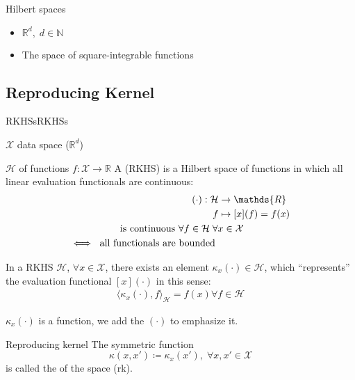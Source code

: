 \begin{example}{Hilbert spaces}{}
	\begin{itemize}
		\item $\mathds{R}^d, \; d \in \mathds{N}$
		\item The space of square-integrable functions
	\end{itemize}
\end{example}

\subsection{Reproducing Kernel}

\begin{definition}[parbox=false]{RKHSs}{RKHSs}

	$\mathcal{X}$ data space ($\mathds{R}^d$)

	$\mathcal{H}$ of functions $f: \mathcal{X} \to \mathds{R}$
	\tcbline
	A  (RKHS) is a Hilbert space
	of functions in which all linear evaluation functionals are continuous:
	\begin{align*}
		[x](\cdot) : \mathcal{H} & \to \mathds{R}                                     \\
		f                        & \mapsto [x](f) = f(x)                              \\
		\span
		\text{ is continuous } \forall f \in \mathcal{H} \; \forall x \in \mathcal{X} \\
		\iff \text{ all functionals are bounded }
	\end{align*}
\end{definition}

\begin{theorem}{}{}
	In a RKHS $\mathcal{H}$, $\forall x \in \mathcal{X}$, there
	exists an element $\kappa_x(\cdot) \in \mathcal{H}$, which
	``represents'' the evaluation functional $[x](\cdot)$
	in this sense:
	\begin{align*}
		\langle \kappa_x(\cdot), f \rangle_{\mathcal{H}} = f(x) \forall f \in \mathcal{H}
	\end{align*}
	\begin{marker}
		$\kappa_x(\cdot)$ is a function, we add the $(\cdot)$ to emphasize it.
	\end{marker}
\end{theorem}


\begin{definition}{Reproducing kernel}{}
	The symmetric function
	\begin{equation*}
		\kappa(x, x') \coloneqq \kappa_x(x'),\; \forall x, x' \in \mathcal{X}
	\end{equation*}
	is called the  of the space (rk).
\end{definition}

